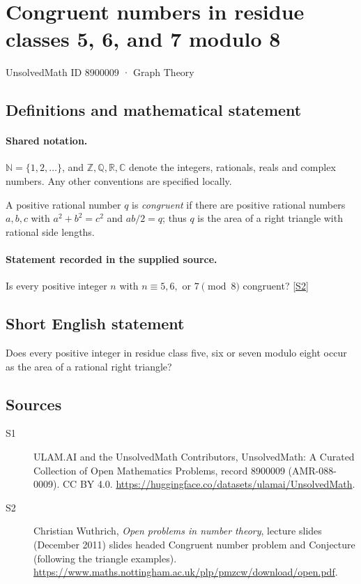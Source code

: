 \documentclass[11pt]{article}
\newcommand{\sref}[2]{\hyperlink{source:#1:#2}{[S#2]}}
\begin{document}
\setcounter{section}{8900008}
\section{Congruent numbers in residue classes 5, 6, and 7 modulo 8}\label{8900009}
{\small\sffamily UnsolvedMath ID 8900009 · Graph Theory}
\subsection{Definitions and mathematical statement}

\paragraph{Shared notation.}$\mathbb N=\{1,2,\ldots\}$, and $\mathbb Z,\mathbb Q,\mathbb R,\mathbb C$ denote the integers, rationals, reals and complex numbers. Any other conventions are specified locally.


A positive rational number $q$ is \emph{congruent} if there are positive rational numbers $a,b,c$ with $a^2+b^2=c^2$ and $ab/2=q$; thus $q$ is the area of a right triangle with rational side lengths.
\paragraph{Statement recorded in the supplied source.}
Is every positive integer $n$ with $n\equiv5,6,$ or $7\pmod8$ congruent? \sref{8900009}{2}
\subsection{Short English statement}
Does every positive integer in residue class five, six or seven modulo eight occur as the area of a rational right triangle?
\subsection{Sources}
\begin{description}
\item[\hypertarget{source:8900009:1}{S1}] ULAM.AI and the UnsolvedMath Contributors, UnsolvedMath: A Curated Collection of Open Mathematics Problems, record 8900009 (AMR-088-0009). CC BY 4.0. \url{https://huggingface.co/datasets/ulamai/UnsolvedMath}.
\item[\hypertarget{source:8900009:2}{S2}] Christian Wuthrich, \emph{Open problems in number theory}, lecture slides (December 2011) slides headed Congruent number problem and Conjecture (following the triangle examples). \url{https://www.maths.nottingham.ac.uk/plp/pmzcw/download/open.pdf}.
\end{description}
\label{end:8900009}
\end{document}
